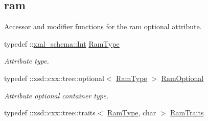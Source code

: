 \subsection*{ram}
\label{_amgrp4641999a7679fcaef2df0e26d11e3c72}
Accessor and modifier functions for the ram optional attribute. \begin{DoxyCompactItemize}
\item 
\hypertarget{classopenstack_1_1xml_1_1Flavor_a48035709babf5ce616fd582e7bb753b5}{
typedef ::\hyperlink{namespacexml__schema_a12d975a13061c938969b2b5143e97645}{xml\_\-schema::Int} \hyperlink{classopenstack_1_1xml_1_1Flavor_a48035709babf5ce616fd582e7bb753b5}{RamType}}
\label{classopenstack_1_1xml_1_1Flavor_a48035709babf5ce616fd582e7bb753b5}

\begin{DoxyCompactList}\small\item\em Attribute type. \item\end{DoxyCompactList}\item 
\hypertarget{classopenstack_1_1xml_1_1Flavor_a6d9711f96a65ecfa199168e92a3cdfee}{
typedef ::xsd::cxx::tree::optional$<$ \hyperlink{classopenstack_1_1xml_1_1Flavor_a48035709babf5ce616fd582e7bb753b5}{RamType} $>$ \hyperlink{classopenstack_1_1xml_1_1Flavor_a6d9711f96a65ecfa199168e92a3cdfee}{RamOptional}}
\label{classopenstack_1_1xml_1_1Flavor_a6d9711f96a65ecfa199168e92a3cdfee}

\begin{DoxyCompactList}\small\item\em Attribute optional container type. \item\end{DoxyCompactList}\item 
\hypertarget{classopenstack_1_1xml_1_1Flavor_abdcd828c1ba2ca3527e4938e2357b48e}{
typedef ::xsd::cxx::tree::traits$<$ \hyperlink{classopenstack_1_1xml_1_1Flavor_a48035709babf5ce616fd582e7bb753b5}{RamType}, char $>$ \hyperlink{classopenstack_1_1xml_1_1Flavor_abdcd828c1ba2ca3527e4938e2357b48e}{RamTraits}}
\label{classopenstack_1_1xml_1_1Flavor_abdcd828c1ba2ca3527e4938e2357b48e}


\end{DoxyCompactItemize}
